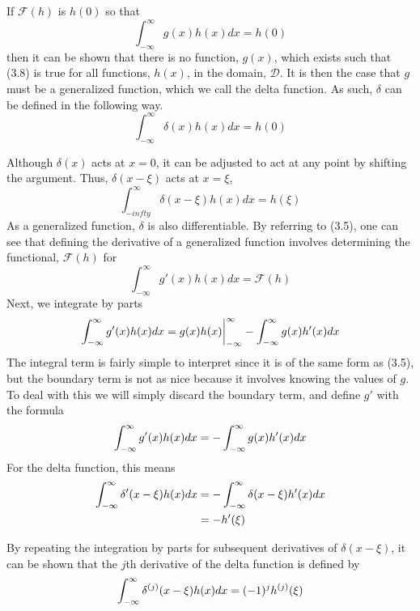 If \(\mathcal{F}(h)\) is \(h(0)\) so that
\begin{equation}
    \int_{-\infty}^{\infty}g(x)h(x) dx=h(0)
\end{equation}
then it can be shown that there is no function, \(g(x)\), which exists such that (3.8) is true for all functions, \(h(x)\), in the domain, \(\mathcal{D}\). It is then the case that \(g\) must be a generalized function, which we call the delta function. As such, \(\delta\) can be defined in the following way.
\begin{equation}
    \int_{-\infty}^{\infty} \delta(x)h(x) dx = h(0)
\end{equation}

Although \(\delta(x)\) acts at \(x=0\), it can be adjusted to act at any point by shifting the argument. Thus, \(\delta(x-\xi)\) acts at \(x=\xi\),
\begin{equation}
    \int_{-infty}^{\infty} \delta(x-\xi)h(x)dx = h(\xi)
\end{equation}
As a generalized function, \(\delta\) is also differentiable. By referring to (3.5), one can see that defining the derivative of a generalized function involves determining the functional, \(\mathcal{F}(h)\) for
\begin{equation}
    \int_{-\infty}^{\infty} g'(x)h(x) dx= \mathcal{F}(h)
\end{equation}
Next, we integrate by parts
\begin{equation}
    \int_{-\infty}^{\infty} g'(x)h(x)dx = g(x)h(x)\biggr\rvert_{-\infty}^{\infty} - \int_{-\infty}^{\infty} g(x)h'(x)dx
\end{equation}
The integral term is fairly simple to interpret since it is of the same form as (3.5), but the boundary term is not as nice because it involves knowing the values of \(g\). To deal with this we will simply discard the boundary term, and define \(g'\) with the formula
\begin{equation}
    \int_{-\infty}^{\infty} g'(x)h(x)dx = -\int_{-\infty}^{\infty} g(x)h'(x)dx
\end{equation}
For the delta function, this means
\begin{equation}
    \begin{split}
        \int_{-\infty}^{\infty} \delta'(x-\xi)h(x)dx &= -\int_{-\infty}^{\infty}\delta(x-\xi)h'(x)dx\\
        &=-h'(\xi)
    \end{split}
\end{equation}

By repeating the integration by parts for subsequent derivatives of \(\delta(x-\xi)\), it can be shown that the \(j\)th derivative of the delta function is defined by
\begin{equation}
     \int_{-\infty}^{\infty} \delta^{(j)}(x-\xi)h(x)dx = (-1)^jh^{(j)}(\xi)
\end{equation}

